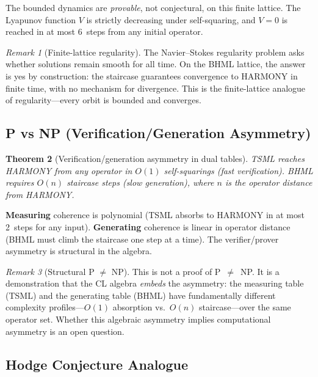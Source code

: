 \documentclass[11pt]{article}
\newtheorem{theorem}{Theorem}[section]
\theoremstyle{definition}
\theoremstyle{remark}
\newtheorem{remark}[theorem]{Remark}
\begin{document}
The bounded dynamics are \emph{provable}, not conjectural, on this finite
lattice.  The Lyapunov function $V$ is strictly decreasing under self-squaring,
and $V = 0$ is reached in at most 6~steps from any initial operator.

\begin{remark}[Finite-lattice regularity]
The Navier--Stokes regularity problem asks whether solutions remain smooth for
all time.  On the BHML lattice, the answer is yes by construction: the staircase
guarantees convergence to HARMONY in finite time, with no mechanism for
divergence.  This is the finite-lattice analogue of regularity---every orbit is
bounded and converges.
\end{remark}

\subsection{P vs NP (Verification/Generation Asymmetry)}
\label{sec:pvnp-analogue}

\begin{theorem}[Verification/generation asymmetry in dual tables]
\label{thm:pvnp}
TSML reaches HARMONY from any operator in $O(1)$ self-squarings (fast
verification).  BHML requires $O(n)$ staircase steps (slow generation), where
$n$ is the operator distance from HARMONY.
\end{theorem}

\textbf{Measuring} coherence is polynomial (TSML absorbs to HARMONY in at most
2~steps for any input).  \textbf{Generating} coherence is linear in operator
distance (BHML must climb the staircase one step at a time).  The
verifier/prover asymmetry is structural in the algebra.

\begin{remark}[Structural P $\neq$ NP]
This is not a proof of P~$\neq$~NP.  It is a demonstration that the CL algebra
\emph{embeds} the asymmetry: the measuring table (TSML) and the generating
table (BHML) have fundamentally different complexity profiles---$O(1)$ absorption
vs.\ $O(n)$ staircase---over the same operator set.  Whether this algebraic
asymmetry implies computational asymmetry is an open question.
\end{remark}

\subsection{Hodge Conjecture Analogue}
\label{sec:hodge-analogue}
\end{document}
